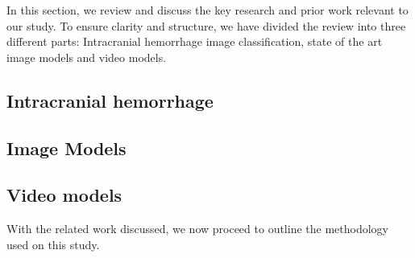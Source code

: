 In this section, we review and discuss the key research and prior work relevant to our study. To ensure clarity and structure, we have divided the review into three different parts: Intracranial hemorrhage image classification, state of the art image models and video models.

\subsection{Intracranial hemorrhage}


% 
\subsection{Image Models}


\subsection{Video models}



With the related work discussed, we now proceed to outline the methodology used on this study.